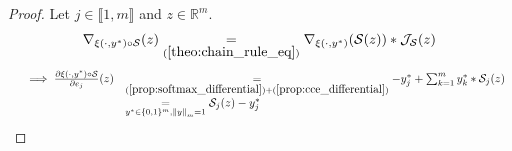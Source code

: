 \documentclass[11pt,en]{elegantpaper}
\newcommand{\norm}[1]{\left\lVert#1\right\rVert}
\newcommand{\Real}{\mathbb{R}}
\begin{document}
\begin{proof}
  Let $j \in \llbracket 1,m \rrbracket$ and $z \in \Real^m$. \begin{equation*}
    \begin{gathered}
      \nabla_{\xi(\cdot,y^*) \circ \mathcal{S}}(z) \underset{(\ref{theo:chain_rule_eq})}{=} \nabla_{\xi(\cdot,y^*)}(\mathcal{S}(z)) * \mathcal{J}_{\mathcal{S}}(z)
    \end{gathered}
  \end{equation*}
  \begin{equation*}
    \begin{array}{lll}
      & \implies \frac{\partial \xi(\cdot,y^*) \circ \mathcal{S}}{\partial e_j} (z)
        & \underset{(\ref{prop:softmax_differential}) + (\ref{prop:cce_differential})}= - y_j^* + \sum_{k=1}^m {y_k^* * \mathcal{S}_j(z)} \\
      & & \underset{y^* \in \{0,1\}^m, \norm{y}_m = 1}{=} \mathcal{S}_j(z) - y_j^*
    \end{array}
  \end{equation*}
\end{proof}
\end{document}
